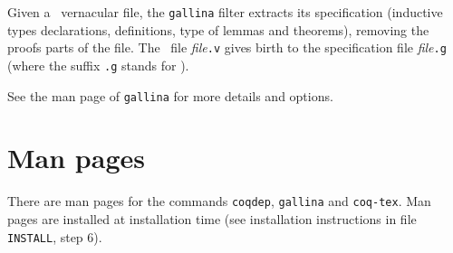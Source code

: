 Given a \Coq\ vernacular file, the {\tt gallina} filter extracts its
specification (inductive types declarations, definitions, type of
lemmas and theorems), removing the proofs parts of the file. The \Coq\
file {\em file}{\tt.v} gives birth to the specification file
{\em file}{\tt.g} (where the suffix {\tt.g} stands for \gallina).

See the man page of {\tt gallina} for more details and options.


\section[Man pages]{Man pages\label{ManPages}}

There are man pages for the commands {\tt coqdep}, {\tt gallina} and
{\tt coq-tex}. Man pages are installed at installation time
(see installation instructions in file {\tt INSTALL}, step 6).


